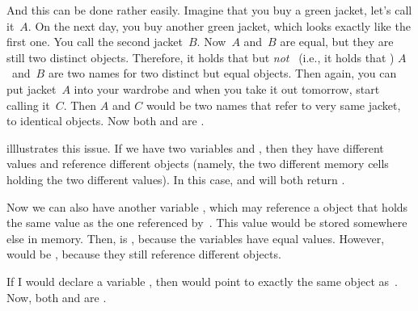 And this can be done rather easily.
Imagine that you buy a green jacket, let's call it~$A$.
On the next day, you buy another green jacket, which looks exactly like the first one.
You call the second jacket~$B$.
Now~$A$ and~$B$ are equal, but they are still two distinct objects.
Therefore, it holds that \pythonIdx{==} but \emph{not} ~(i.e., it holds that )
$A$~and~$B$ are two names for two distinct but equal objects.
Then again, you can put jacket~$A$ into your wardrobe and when you take it out tomorrow, start calling it~$C$.
Then $A$ and $C$ would be two names that refer to very same jacket, to identical objects.
Now both \pythonIdx{==} and  are .%
%
%
\begin{sloppypar}%
 illlustrates this issue.
If we have two variables  and , then they have different values and reference different objects (namely, the two different memory cells holding the two different  values).
In this case, \pythonIdx{==} and  will both return .%
\end{sloppypar}%
%
Now we can also have another variable , which may reference a  object that holds the same value as the one referenced by~.
This value would be stored somewhere else in memory.
Then,  is , because the variables have equal values.
However,  would be , because they still reference different objects.

If I would declare a variable , then  would point to exactly the same  object as~.
Now, both  and  are .

